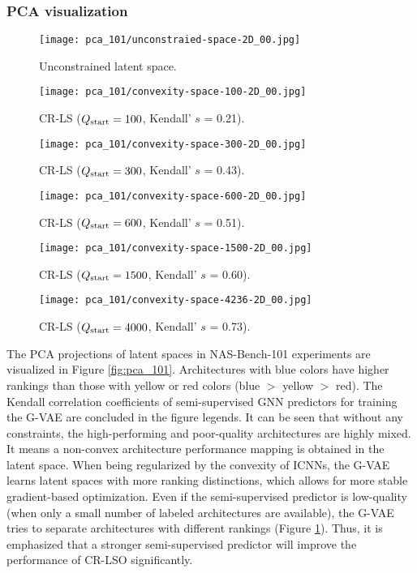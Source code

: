 \documentclass[10pt,twocolumn,letterpaper]{article}
\begin{document}
\subsubsection{PCA visualization}
\begin{figure*}
	\centering
	\begin{subfigure}{0.33 \linewidth}
		\texttt{[image: pca\_101/unconstraied-space-2D\_00.jpg]}
		\caption{Unconstrained latent space.}
	\end{subfigure}
	\begin{subfigure}{0.33 \linewidth}
		\texttt{[image: pca\_101/convexity-space-100-2D\_00.jpg]}
		\caption{CR-LS ($Q_{\rm start} = 100$, Kendall' $s$ = 0.21).}
		\label{fig:pca_101_100}
	\end{subfigure}
	\begin{subfigure}{0.33 \linewidth}
	\texttt{[image: pca\_101/convexity-space-300-2D\_00.jpg]}
	\caption{CR-LS ($Q_{\rm start} = 300$, Kendall' $s$ = 0.43).}
	\end{subfigure}
	\begin{subfigure}{0.33 \linewidth}
	\texttt{[image: pca\_101/convexity-space-600-2D\_00.jpg]}
	\caption{CR-LS ($Q_{\rm start} = 600$, Kendall' $s$ = 0.51).}
	\end{subfigure}
	\begin{subfigure}{0.33 \linewidth}
	\texttt{[image: pca\_101/convexity-space-1500-2D\_00.jpg]}
	\caption{CR-LS ($Q_{\rm start} = 1500$, Kendall' $s$ = 0.60).}
	\end{subfigure}
	\begin{subfigure}{0.33 \linewidth}
	\texttt{[image: pca\_101/convexity-space-4236-2D\_00.jpg]}
	\caption{CR-LS ($Q_{\rm start} = 4000$, Kendall' $s$ = 0.73).}
	\end{subfigure}
	\caption{The PCA visualizations of unconstrained and convexity regularized latent spaces in NAS-Bench-101. The architectures with blue colors own higher rankings than those with yellow or red colors (blue $>$ yellow $>$ red).}
	\label{fig:pca_101}
\end{figure*} 
The PCA projections of latent spaces in NAS-Bench-101 experiments are visualized in Figure \ref{fig:pca_101}. Architectures with blue colors have higher rankings than those with yellow or red colors (blue $>$ yellow $>$ red). The Kendall correlation coefficients of semi-supervised GNN predictors for training the G-VAE are concluded in the figure legends. It can be seen that without any constraints, the high-performing and poor-quality architectures are highly mixed. It means a non-convex architecture performance mapping is obtained in the latent space. When being regularized by the convexity of ICNNs, the G-VAE learns latent spaces with more ranking distinctions, which allows for more stable gradient-based optimization. Even if the semi-supervised predictor is low-quality (when only a small number of labeled architectures are available), the G-VAE tries to separate architectures with different rankings (Figure \ref{fig:pca_101_100}). Thus, it is emphasized that a stronger semi-supervised predictor will improve the performance of CR-LSO significantly.  
\end{document}
